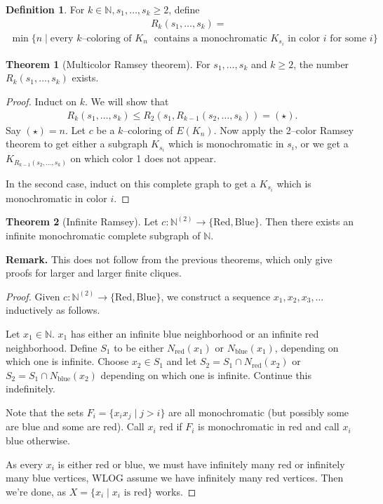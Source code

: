 \documentclass{article}
\theoremstyle{definition}
\newtheorem{theorem}{Theorem}[section]
\newtheorem{defn}{Definition}[section]
\begin{document}
\begin{defn}
    For $k \in \mathbb{N}, s_1,\ldots,s_k \ge 2$, define 
    \begin{align*}
        &R_k(s_1,\ldots,s_k) = \\
        \min \{n \mid \text{every }k \text{--coloring of }K_n &\text{ contains a monochromatic }K_{s_i} \text{ in color }i \text{ for some }i\}
    \end{align*}
\end{defn}
\begin{theorem}[Multicolor Ramsey theorem]
    For $s_1,\ldots,s_k$ and $k\ge 2$, the number $R_k(s_1,\ldots,s_k)$ exists.
\end{theorem}
\begin{proof}
    Induct on $k$. We will show that
    \begin{align*}
        R_k(s_1,\ldots,s_k) \le R_2(s_1,R_{k-1}(s_2,\ldots,s_k)) = (\star).
    \end{align*}
    Say $(\star)=n$. Let $c$ be a $k$--coloring of $E(K_n)$. Now apply the 2--color Ramsey theorem to get either a subgraph $K_{s_i}$ which is monochromatic in $s_i$, or we get a $K_{R_{k-1}(s_2,\ldots,s_k)}$ on which color 1 does not appear. 

    In the second case, induct on this complete graph to get a $K_{s_i}$ which is monochromatic in color $i$.
\end{proof}

\begin{theorem}[Infinite Ramsey]
    Let $c : \mathbb{N}^{(2)} \to \{\text{Red},\text{Blue}\}$. Then there exists an infinite monochromatic complete subgraph of $\mathbb{N}$.
\end{theorem}
\textbf{Remark.} This does not follow from the previous theorems, which only give proofs for larger and larger finite cliques.
\begin{proof}
    Given $c : \mathbb{N}^{(2)} \to \{\text{Red},\text{Blue}\}$, we construct a sequence $x_1,x_2,x_3,\ldots$ inductively as follows.
    \vspace{1mm}
    
    Let $x_1 \in \mathbb{N}$. $x_1$ has either an infinite blue neighborhood or an infinite red neighborhood. Define $S_1$ to be either $N_{\text{red}}(x_1)$ or $N_{\text{blue}}(x_1)$, depending on which one is infinite. Choose $x_2 \in S_1$ and let $S_2 = S_1 \cap N_{\text{red}}(x_2)$ or $S_2= S_1 \cap N_{\text{blue}}(x_2)$ depending on which one is infinite. Continue this indefinitely.
    \vspace{1mm}
    
    Note that the sets $F_i = \{x_ix_j \mid j > i\}$ are all monochromatic (but possibly some are blue and some are red). Call $x_i$ red if $F_i$ is monochromatic in red and call $x_i$ blue otherwise.

    As every $x_i$ is either red or blue, we must have infinitely many red or infinitely many blue vertices, WLOG assume we have infinitely many red vertices. Then we're done, as $X= \{x_i \mid x_i \text{ is red}\}$ works.
\end{proof}
\end{document}
